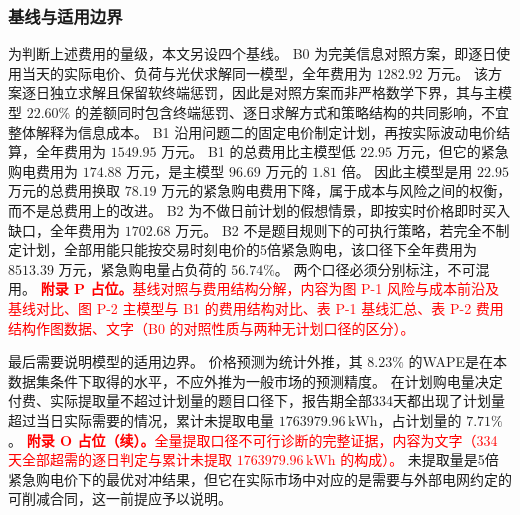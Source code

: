 \subsubsection{基线与适用边界}

为判断上述费用的量级，本文另设四个基线。
B0 为完美信息对照方案，即逐日使用当天的实际电价、负荷与光伏求解同一模型，全年费用为 \(1282.92\) 万元。
该方案逐日独立求解且保留软终端惩罚，因此是对照方案而非严格数学下界，其与主模型 \(22.60\%\) 的差额同时包含终端惩罚、逐日求解方式和策略结构的共同影响，不宜整体解释为信息成本。
B1 沿用问题二的固定电价制定计划，再按实际波动电价结算，全年费用为 \(1549.95\) 万元。
B1 的总费用比主模型低 \(22.95\) 万元，但它的紧急购电费用为 \(174.88\) 万元，是主模型 \(96.69\) 万元的 \(1.81\) 倍。
因此主模型是用 \(22.95\) 万元的总费用换取 \(78.19\) 万元的紧急购电费用下降，属于成本与风险之间的权衡，而不是总费用上的改进。
B2 为不做日前计划的假想情景，即按实时价格即时买入缺口，全年费用为 \(1702.68\) 万元。
B2 不是题目规则下的可执行策略，若完全不制定计划，全部用能只能按交易时刻电价的5倍紧急购电，该口径下全年费用为 \(8513.39\) 万元，紧急购电量占负荷的 \(56.74\%\)。
两个口径必须分别标注，不可混用。
\textcolor{red}{\textbf{附录 P 占位。}基线对照与费用结构分解，内容为图 P-1 风险与成本前沿及基线对比、图 P-2 主模型与 B1 的费用结构对比、表 P-1 基线汇总、表 P-2 费用结构作图数据、文字（B0 的对照性质与两种无计划口径的区分）。}

最后需要说明模型的适用边界。
价格预测为统计外推，其 \(8.23\%\) 的WAPE是在本数据集条件下取得的水平，不应外推为一般市场的预测精度。
在计划购电量决定付费、实际提取量不超过计划量的题目口径下，报告期全部334天都出现了计划量超过当日实际需要的情况，累计未提取电量 \(1763979.96\,\mathrm{kWh}\)，占计划量的 \(7.71\%\)。
\textcolor{red}{\textbf{附录 O 占位（续）。}全量提取口径不可行诊断的完整证据，内容为文字（334 天全部超需的逐日判定与累计未提取 \(1763979.96\,\mathrm{kWh}\) 的构成）。}
未提取量是5倍紧急购电价下的最优对冲结果，但它在实际市场中对应的是需要与外部电网约定的可削减合同，这一前提应予以说明。
